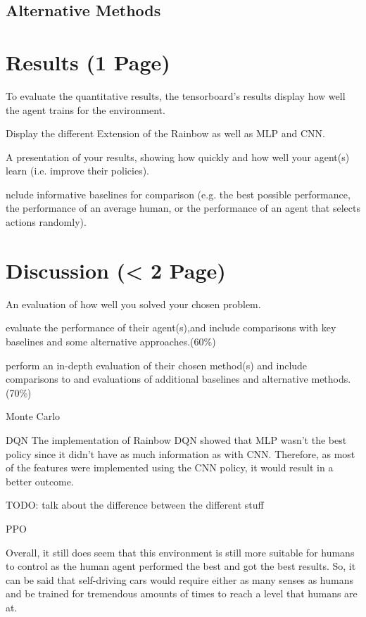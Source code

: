\documentclass{article}
\begin{document}
\subsection{Alternative Methods}

\section{Results (1 Page)} 
To evaluate the quantitative results, the tensorboard's results display how well the agent trains for the environment.

Display the different Extension of the Rainbow as well as MLP and CNN.

A presentation of your results, showing how quickly and how well your agent(s) learn (i.e. improve their policies).

nclude informative baselines for comparison 
(e.g. the best
possible performance, the performance of an average human, or the performance of an agent
that selects actions randomly).



\section{Discussion (< 2 Page)}
An evaluation of how well you solved your chosen problem.

evaluate the performance of their agent(s),and include comparisons with key baselines and some alternative approaches.(60\%)



perform an in-depth evaluation of their chosen method(s) and include comparisons to and evaluations of additional baselines and alternative methods.(70\%)

Monte Carlo

DQN
The implementation of Rainbow DQN showed that MLP wasn't the best policy since it didn't have as much information as with CNN.
Therefore, as most of the features were implemented using the CNN policy, it would result in a better outcome.

TODO: talk about the difference between the different stuff

PPO

Overall, it still does seem that this environment is still more suitable for humans to control as the human agent performed the best and got the best results.
So, it can be said that self-driving cars would require either as many senses as humans and be trained for tremendous amounts of times to reach a level that humans are at.
\end{document}
